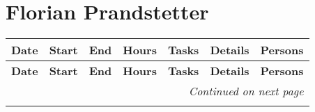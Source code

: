 \section{Florian Prandstetter}

\renewcommand{\arraystretch}{1.3} %
\footnotesize
\begin{longtable}{@{}p{1.8cm} p{1.2cm} p{1.2cm} p{1.2cm} p{2cm} p{4.5cm} p{2cm}@{}}
    \toprule
    \textbf{Date} & \textbf{Start} & \textbf{End} & \textbf{Hours} & \textbf{Tasks} & \textbf{Details} & \textbf{Persons} \\
    \midrule
    \endfirsthead

    \toprule
    \textbf{Date} & \textbf{Start} & \textbf{End} & \textbf{Hours} & \textbf{Tasks} & \textbf{Details} & \textbf{Persons} \\
    \midrule
    \endhead

    \midrule
    \multicolumn{7}{r}{\textit{Continued on next page}} \\
    \midrule
    \endfoot

    \bottomrule
    \endlastfoot


\end{longtable}
